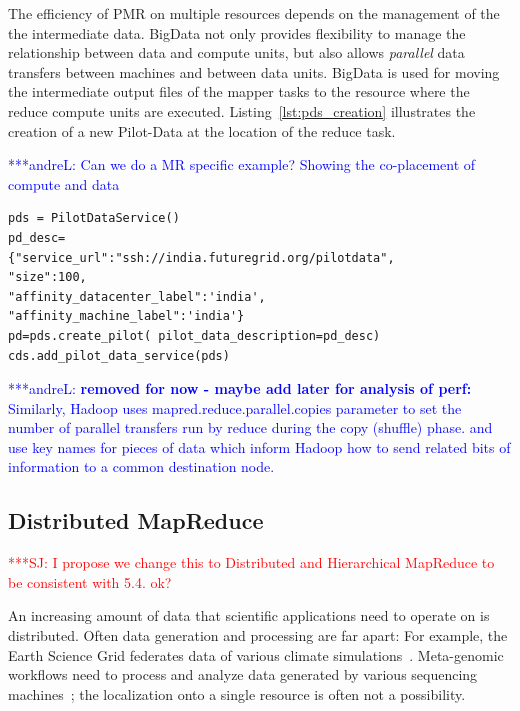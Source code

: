 \documentclass{acm_proc_article-sp}
\newcommand{\jhanote}[1]{ {\textcolor{red} { ***SJ: #1 }}}
\newcommand{\alnote}[1]{ {\textcolor{blue} { ***andreL: #1 }}}
\newcommand{\alnote}[1]{}
\newcommand{\jhanote}[1]{}
\newcommand{\upp}{\vspace*{-0.5em}}
\newcommand{\pilotmapreduce}{Pilot-MapReduce\xspace}
\begin{document}

The efficiency of PMR  on multiple resources depends on
the management of the the intermediate data. BigData not only
provides flexibility to manage the relationship between data and
compute units, but also allows {\it parallel} data transfers between
machines and between data units.  BigData is used for moving the
intermediate output files of the mapper tasks to the resource where
the reduce compute units are executed.  Listing~\ref{lst:pds_creation}
illustrates the creation of a new Pilot-Data at the location of the
reduce task.


\alnote{Can we do a MR specific example? Showing the co-placement of compute and 
data}

\lstset{
language=Python,
frame=single,
captionpos=b,
stringstyle=\ttfamily,
basicstyle=\scriptsize\ttfamily
}
\noindent\begin{minipage}{0.47 \textwidth}
\begin{lstlisting}[caption={\textbf{Pilot Data Creation:} Instantiation of a Pilot Data using Pilot Data Description}, label={lst:pds_creation}]
pds = PilotDataService()
pd_desc=
{"service_url":"ssh://india.futuregrid.org/pilotdata",
"size":100,
"affinity_datacenter_label":'india',
"affinity_machine_label":'india'}
pd=pds.create_pilot( pilot_data_description=pd_desc)
cds.add_pilot_data_service(pds)
\end{lstlisting}
\end{minipage}

\alnote{\textbf{removed for now - maybe add later for analysis of perf:} Similarly, Hadoop uses mapred.reduce.parallel.copies parameter to set
the number of parallel transfers run by reduce during the
copy (shuffle) phase.  and use key names for pieces of data which
inform Hadoop how to send related bits of information to a common
destination node.}


\upp
\subsection{Distributed MapReduce}
\label{sec:pmr-distributed} \jhanote{I propose we change this to Distributed and 
Hierarchical MapReduce to be consistent with 5.4. ok?}

An increasing amount of data that scientific applications need to
operate on is distributed. Often data generation
and processing are far apart: For example, the Earth Science Grid
federates data of various climate simulations~\cite{ESG}. Meta-genomic
workflows need to process and analyze data generated by various
sequencing machines~\cite{Jha:2011fk}; the localization onto a single
resource is often not a possibility.
\end{document}
